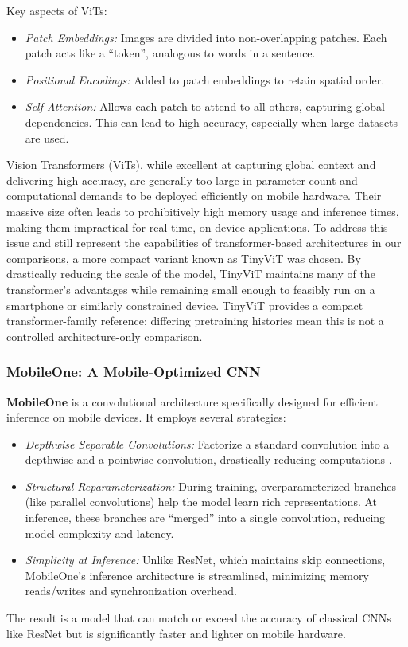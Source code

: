 \documentclass[12pt]{article}
\begin{document}
Key aspects of ViTs:
\begin{itemize}
    \item \textit{Patch Embeddings:} Images are divided into non-overlapping patches. Each patch acts like a ``token'', analogous to words in a sentence.
    \item \textit{Positional Encodings:} Added to patch embeddings to retain spatial order.
    \item \textit{Self-Attention:} Allows each patch to attend to all others, capturing global dependencies. This can lead to high accuracy, especially when large datasets are used.
\end{itemize}

Vision Transformers (ViTs), while excellent at capturing global context and delivering high accuracy, are generally too large in parameter count and computational demands to be deployed efficiently on mobile hardware. Their massive size often leads to prohibitively high memory usage and inference times, making them impractical for real-time, on-device applications. To address this issue and still represent the capabilities of transformer-based architectures in our comparisons, a more compact variant known as TinyViT was chosen. By drastically reducing the scale of the model, TinyViT maintains many of the transformer’s advantages while remaining small enough to feasibly run on a smartphone or similarly constrained device. TinyViT provides a compact transformer-family reference; differing pretraining histories mean this is not a controlled architecture-only comparison.

\subsubsection*{MobileOne: A Mobile-Optimized CNN}
\textbf{MobileOne} \cite{vasu2023mobileoneimprovedmillisecondmobile} is a convolutional architecture specifically designed for efficient inference on mobile devices. It employs several strategies:
\begin{itemize}
    \item \textit{Depthwise Separable Convolutions:} Factorize a standard convolution into a depthwise and a pointwise convolution, drastically reducing computations \cite{howard2017mobilenetsefficientconvolutionalneural}.
    \item \textit{Structural Reparameterization:} During training, overparameterized branches (like parallel convolutions) help the model learn rich representations. At inference, these branches are ``merged'' into a single convolution, reducing model complexity and latency.
    \item \textit{Simplicity at Inference:} Unlike ResNet, which maintains skip connections, MobileOne’s inference architecture is streamlined, minimizing memory reads/writes and synchronization overhead.
\end{itemize}
The result is a model that can match or exceed the accuracy of classical CNNs like ResNet but is significantly faster and lighter on mobile hardware.
\end{document}
